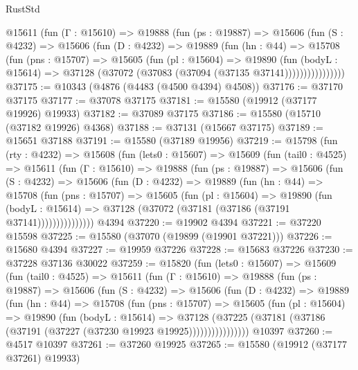 \begin{lexlean}{RustStd}
\begin{coremodule}
          @15611
            (fun (Γ : @15610) =>
            @19888
              (fun (ps : @19887) =>
              @15606
                (fun (S : @4232) =>
                @15606
                  (fun (D : @4232) =>
                  @19889
                    (fun (hn : @44) =>
                    @15708
                      (fun (pns : @15707) =>
                      @15605
                        (fun (pl : @15604) =>
                        @19890
                          (fun (bodyL : @15614) =>
                          @37128 (@37072 (@37083 (@37094 (@37135 @37141))))))))))))))))
@37175 := @10343 (@4876 (@4483 (@4500 @4394) @4508))
@37176 := @37170 @37175
@37177 := @37078 @37175
@37181 := @15580 (@19912 (@37177 @19926) @19933)
@37182 := @37089 @37175
@37186 := @15580 (@15710 (@37182 @19926) @4368)
@37188 := @37131 (@15667 @37175)
@37189 := @15651 @37188
@37191 := @15580 (@37189 @19956)
@37219 := @15798
    (fun (rty : @4232) =>
    @15608
      (fun (lets0 : @15607) =>
      @15609
        (fun (tail0 : @4525) =>
        @15611
          (fun (Γ : @15610) =>
          @19888
            (fun (ps : @19887) =>
            @15606
              (fun (S : @4232) =>
              @15606
                (fun (D : @4232) =>
                @19889
                  (fun (hn : @44) =>
                  @15708
                    (fun (pns : @15707) =>
                    @15605
                      (fun (pl : @15604) =>
                      @19890
                        (fun (bodyL : @15614) =>
                        @37128 (@37072 (@37181 (@37186 (@37191 @37141)))))))))))))))
    @4394
@37220 := @19902 @4394
@37221 := @37220 @15598
@37225 := @15580 (@37070 (@19899 (@19901 @37221)))
@37226 := @15680 @4394
@37227 := @19959 @37226
@37228 := @15683 @37226
@37230 := @37228 @37136 @30022
@37259 := @15820
    (fun (lets0 : @15607) =>
    @15609
      (fun (tail0 : @4525) =>
      @15611
        (fun (Γ : @15610) =>
        @19888
          (fun (ps : @19887) =>
          @15606
            (fun (S : @4232) =>
            @15606
              (fun (D : @4232) =>
              @19889
                (fun (hn : @44) =>
                @15708
                  (fun (pns : @15707) =>
                  @15605
                    (fun (pl : @15604) =>
                    @19890
                      (fun (bodyL : @15614) =>
                      @37128
                        (@37225
                          (@37181 (@37186 (@37191 (@37227 (@37230 @19923 @19925))))))))))))))))
    @10397
@37260 := @4517 @10397
@37261 := @37260 @19925
@37265 := @15580 (@19912 (@37177 @37261) @19933)

\end{coremodule}
\end{lexlean}
